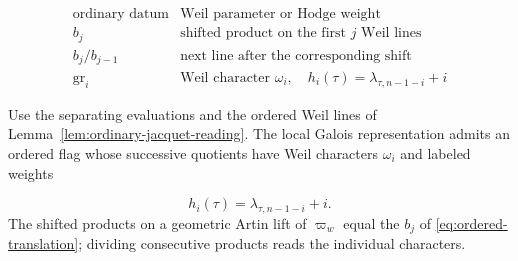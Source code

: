 \begin{construction}
\[
\begin{array}{ll}
\text{ordinary datum}&\text{Weil parameter or Hodge weight}\\ \hline
b_j&\text{shifted product on the first }j\text{ Weil lines}\\
b_j/b_{j-1}&\text{next line after the corresponding shift}\\
\operatorname{gr}_i&\text{Weil character }\omega_i,\quad
       h_i(\tau)=\lambda_{\tau,n-1-i}+i
\end{array}
\]
\caption{The cumulative ordinary eigenvalues determine the successive characters of the flag at a separating evaluation. The shifts are those of \eqref{eq:ordered-translation}.}\label{fig:ordinary-ordered-flag}
\end{construction}

\begin{proposition}
\label{prop:ordinary-ordered-separating-flag}
Use the separating evaluations and the ordered Weil lines of
Lemma~\ref{lem:ordinary-jacquet-reading}. The local Galois
representation admits an ordered flag whose successive quotients
have Weil characters \(\omega_i\) and labeled weights

\[
 h_i(\tau)=\lambda_{\tau,n-1-i}+i.
\]
 The shifted products on a
geometric Artin lift of \(\varpi_w\) equal the \(b_j\) of
\eqref{eq:ordered-translation}; dividing consecutive products reads
the individual characters.
\end{proposition}

